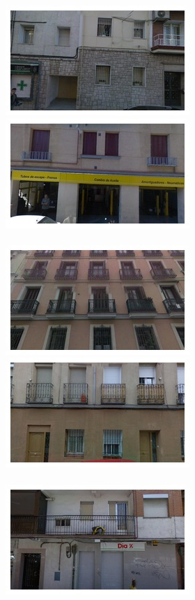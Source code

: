\begin{figure}
\begin{minipage}{\linewidth}
\begin{minipage}{0.3\linewidth}
      \includegraphics[width=0.49\linewidth]{imgs/view/mosaicsV3/mosaic0002.jpg}
      \includegraphics[width=0.49\linewidth]{imgs/view/mosaicsV3/mosaic0003.jpg}
      \\ \vspace{-3mm} \\
      \includegraphics[width=0.49\linewidth]{imgs/view/mosaicsV3/mosaic0004.jpg}
      \includegraphics[width=0.49\linewidth]{imgs/view/mosaicsV3/mosaic0005.jpg}
      \\ \vspace{-3mm} \\
      \includegraphics[width=0.49\linewidth]{imgs/view/mosaicsV3/mosaic0006.jpg}

\end{minipage}
\end{minipage}
\end{figure}
